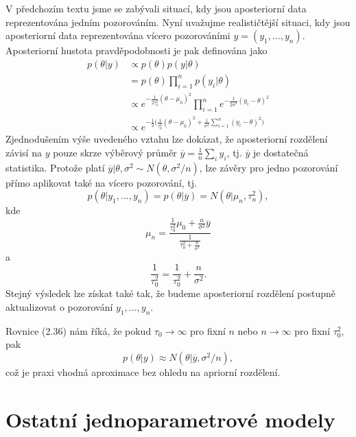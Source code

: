 V předchozím textu jsme se zabývali situací, kdy jsou aposteriorní data reprezentována jedním pozorováním. Nyní uvažujme realističtější situaci, kdy jsou aposteriorní data reprezentována vícero pozorováními $y = (y_1, ..., y_n)$. Aposteriorní hustota pravděpodobnosti je pak definována jako
\begin{equation}
\begin{split}
p(\theta | y) & \varpropto p(\theta) p(y | \theta)\\
 & = p(\theta) \prod_{i = 1}^n p(y_i | \theta)\\
 & \varpropto e^{-\frac{1}{2 \tau_0^2}(\theta - \mu_0)^2}\prod_{i = 1}^n e^{-\frac{1}{2 \sigma^2}(y_i - \theta)^2}\\
 & \varpropto e^{-\frac{1}{2}\Big(\frac{1}{\tau_0^2}(\theta - \mu_0)^2 + \frac{1}{\sigma^2} \sum_{i = 1}^n (y_i - \theta) ^ 2\Big)}
\end{split}
\end{equation}
Zjednodušením výše uvedeného vztahu lze dokázat, že aposteriorní rozdělení závisí na $y$ pouze skrze výběrový průměr $\overline{y} = \frac{1}{n}\sum_i y_i$, tj. $\overline{y}$ je dostatečná statistika. Protože platí $\overline{y} | \theta, \sigma^2 \sim N(\theta, \sigma^2 / n)$, lze závěry pro jedno pozorování přímo aplikovat také na vícero pozorování, tj.
\begin{equation}
p(\theta | y_1, ..., y_n) = p(\theta | \overline{y}) = N(\theta | \mu_n, \tau_n^2),
\end{equation}
kde
\begin{equation}
\mu_n = \frac{\frac{1}{\tau_0^2}\mu_0 + \frac{n}{\sigma^2}\overline{y}}{\frac{1}{\tau_0^2 + \frac{n}{\sigma^2}}}
\end{equation}
a
\begin{equation}
\frac{1}{\tau_0^2} = \frac{1}{\tau_0^2} + \frac{n}{\sigma^2}.
\end{equation}
Stejný výsledek lze získat také tak, že budeme aposteriorní rozdělení postupně aktualizovat o pozorování $y_1, ..., y_n$.

Rovnice (2.36) nám říká, že pokud $\tau_0 \rightarrow \infty$ pro fixní $n$ nebo $n \rightarrow \infty$ pro fixní $\tau_0^2$, pak
\begin{equation}
p(\theta | y) \approx N(\theta | \overline{y}, \sigma^2 / n),
\end{equation}
což je praxi vhodná aproximace bez ohledu na apriorní rozdělení.

\section{Ostatní jednoparametrové modely}

